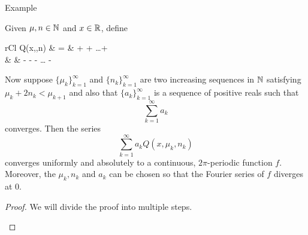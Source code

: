 \begin{section}{\fejers Example}
\begin{thrm}
	Given $\mu, n \in \mathbb{N}$ and ${x} \in \mathbb{R}$, define
		\begin{IEEEeqnarray*}{rCl}
			Q(x,\mu,n) & = &  +
				 + \ldots +
				 \\
			& & -  -
				 - \ldots
				- 
		\end{IEEEeqnarray*}
	Now suppose $\{\mu_k\}_{k=1}^\infty$ and $\{n_k\}_{k=1}^\infty$
	are two increasing sequences in $\mathbb{N}$ satisfying
	$\mu_k+2n_k < \mu_{k+1}$ and also that $\{a_k\}_{k=1}^\infty$
	is a sequence of positive reals such that
		\begin{displaymath}
			\sum_{k=1}^\infty a_k
		\end{displaymath}
	converges. Then the series
		\begin{displaymath}
			\sum_{k=1}^\infty a_k Q(x,\mu_k,n_k)
		\end{displaymath}
	converges uniformly and absolutely to a continuous, 
	$2\pi$-periodic function $f$. Moreover, the $\mu_k, n_k$
	and $a_k$ can be chosen so that the Fourier series
	of $f$ diverges at 0.
\end{thrm}

\begin{proof}
	We will divide the proof into multiple steps.
		\begin{enumerate}[{Step} 1.]
		

\end{enumerate}
\end{proof}
\end{section}
